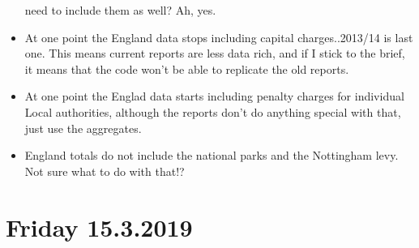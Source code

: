 \documentclass[]{article}
\begin{document}
\begin{itemize}
  need to include them as well? Ah, yes.
\item
  At one point the England data stops including capital charges..2013/14
  is last one. This means current reports are less data rich, and if I
  stick to the brief, it means that the code won't be able to replicate
  the old reports.
\item
  At one point the Englad data starts including penalty charges for
  individual Local authorities, although the reports don't do anything
  special with that, just use the aggregates.
\item
  England totals do not include the national parks and the Nottingham
  levy. Not sure what to do with that!?
\end{itemize}

\hypertarget{friday-15.3.2019}{%
\section{Friday 15.3.2019}\label{friday-15.3.2019}}
\end{document}
